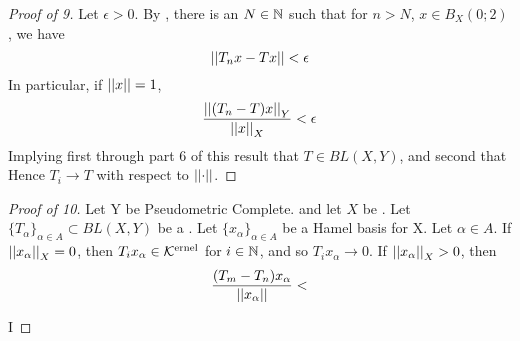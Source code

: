 \begin{prop}
\begin{proof}[Proof of 9]
    Let $\epsilon > 0$. 
    By \UniformConvergence, 
    there is an $N \in \mathbb{N}$ such that 
    for $n>N$, $x \in B_X(0;2)$, we have
    \begin{equation}
    \left|\left| T_nx-Tx \right|\right| < \epsilon
    \end{equation}
    In particular, if $\left|\left| x \right|\right| = 1$, 
    \begin{equation}
    \frac{\left|\left| (T_n-T)x \right|\right|_Y}{\left|\left| x \right|\right|_X} < \epsilon
    \end{equation}
    Implying first through part 6 of this result
    that $T \in BL(X,Y)$, and second that
    Hence $T_i \to T$ with respect to $\left|\left| \cdot \right|\right|$. 
\end{proof}
\begin{proof}[Proof of 10]
    Let Y be Pseudometric Complete. 
    and let $X$ be \NonDegenerate. 
    Let $\{T_\alpha\}_{\alpha \in A} \subset BL(X,Y)$ 
    be a \PseudometricCauchySequence.
    Let $\{x_{\alpha}\}_{\alpha \in A}$ be a Hamel basis for X. 
    Let $\alpha \in A$. 
    If $\left|\left| x_\alpha \right|\right|_X=0$, then $T_ix_{\alpha} \in \bf\mathcal{K}\rm^{ernel}$ for $i \in \mathbb{N}$, 
    and so $T_ix_{\alpha} \to 0$. 
    If $\left|\left| x_{\alpha} \right|\right|_X > 0$, then 
    \begin{equation}
    \frac{(T_m-T_n)x_{\alpha}}{\left|\left| x_{\alpha} \right|\right|} < 
    \end{equation}

    I



\end{proof}

\end{prop}


\begin{rmk}

\end{rmk}

